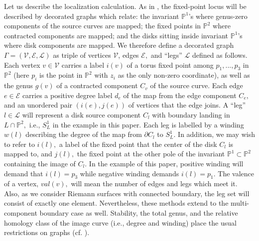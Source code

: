 \documentclass[a4paper,11pt]{article}
\newcommand{\PP}{{\mathbb{P}}}
\begin{document}

Let us describe the localization calculation.
As in \cite{Kont}, the fixed-point locus will be
described by decorated
graphs which relate: the invariant $\PP^1$'s where
genus-zero components of the source curves are
mapped; the fixed points in $\PP^2$ where
contracted components are mapped; and the
disks sitting inside invariant $\PP^1$'s where
disk components are mapped.  We therefore define
a decorated graph
$\Gamma = ({\mathcal V},{\mathcal E},
{\mathcal L})$
as triple of
vertices ${\mathcal V}$, edges $\mathcal E,$ and ``legs'' 
$\mathcal L$ defined as
follows.
Each vertex $v\in\mathcal V$ carries a label $i(v)$
of a torus fixed point among
$p_1,...,p_3$
in $\PP^2$ (here $p_i$ is the point in $\PP^2$
with $z_i$ as the only non-zero coordinate),
as well as the genus $g(v)$ of a contracted
component $C_v$ of the source curve. 
Each edge $e\in \mathcal E$ carries
a positive degree label $d_e$
of the map from the edge component $C_e,$
and an unordered pair $(i(e),j(e))$ of vertices that
the edge joins.  A ``leg'' $l\in \mathcal L$
will represent a disk source component $C_l$ with
boundary landing in $L\cap \PP^2,$ i.e., $S^1_L$
in the example in this paper.  Each leg is labelled
by a winding $w(l)$ describing the degree of the map
from $\partial C_l$ to $S^1_L.$  In addition,
we may wish to refer to $i(l),$ a label of the fixed point
that the center of the disk $C_l$ is mapped to,
and $j(l),$ the fixed point at the other pole of the
invariant $\PP^1\subset \PP^2$ containing the image
of $C_l.$
In
the example of this paper, positive winding will demand
that $i(l) = p_3$ while negative winding demands $i(l) = p_1.$ 
The valence of a vertex, $val(v),$ will
mean the number of
edges and legs which meet it.
Also, as we consider
Riemann surfaces with connected boundary, the leg
set will consist of exactly one element.  Nevertheless,
these methods extend to the multi-component
boundary case as well.
Stability, the total genus, and the relative homology
class of the image curve
(i.e., degree and winding) place the usual restrictions on
graphs (cf. \cite{Kont}).
\end{document}
